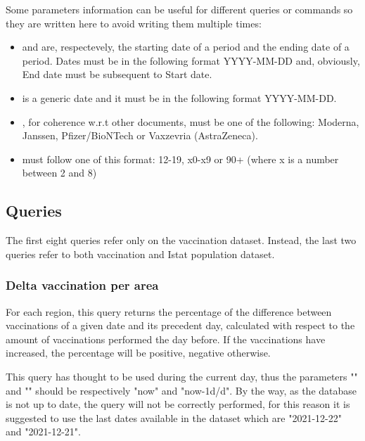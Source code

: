 \documentclass{article}
\begin{document}
Some parameters information can be useful for different queries or commands so they are written here to avoid writing them multiple times:
\begin{itemize}
    \item {\color{magenta}{Start date}} and {\color{magenta}{End date}} are, respectevely, the starting date of a period and the ending date of a period. Dates must be in the following format YYYY-MM-DD and, obviously, End date must be subsequent to Start date.
    \item {\color{magenta}{Date}} is a generic date and it must be in the following format YYYY-MM-DD.
    \item {\color{magenta}{Supplier}}, for coherence w.r.t other documents, must be one of the following: Moderna, Janssen, Pfizer/BioNTech or Vaxzevria (AstraZeneca).
    \item {\color{magenta}{Age range}} must follow one of this format: 12-19, x0-x9 or 90+ (where x is a number between 2 and 8)
\end{itemize}
\subsection{Queries}
The first eight queries refer only on the vaccination dataset. Instead, the last two queries refer to both vaccination and Istat population dataset.
\subsubsection{Delta vaccination per area}
For each region, this query returns the percentage of the difference between vaccinations of a given date and its precedent day, calculated with respect to the amount of vaccinations performed the day before.
If the vaccinations have increased, the percentage will be positive, negative otherwise.

This query has thought to be used during the current day, thus the parameters "{\color{magenta}{Date 1}}" and "{\color{magenta}{Date 2}}" should be respectively "now" and "now-1d/d". By the way, as the database is not up to date, the query will not be correctly performed, for this reason it is suggested to use the last dates available in the dataset which are "2021-12-22" and "2021-12-21". 
\end{document}
